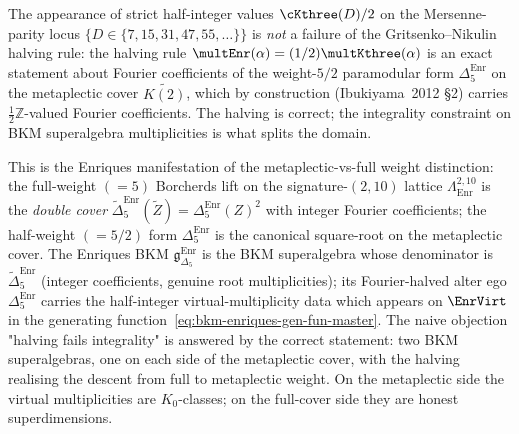 \begin{remark}
\label{rem:bkm-enriques-integrality-dichotomy}
The appearance of strict half-integer values $\cKthree(D)/2$ on the
Mersenne-parity locus $\{D\in\{7,15,31,47,55,\ldots\}\}$ is \emph{not}
a failure of the Gritsenko--Nikulin halving rule: the halving rule
$\multEnr(\alpha) = (1/2)\multKthree(\alpha)$ is an exact statement
about Fourier coefficients of the weight-$5/2$ paramodular form
$\Delta_5^{\mathrm{Enr}}$ on the metaplectic cover
$\widetilde{K(2)}$, which by construction (Ibukiyama~2012 \S 2)
carries $\tfrac{1}{2}\mathbb{Z}$-valued Fourier coefficients.
The halving is correct; the integrality constraint on BKM
superalgebra multiplicities is what splits the domain.

This is the Enriques manifestation of the metaplectic-vs-full
weight distinction: the full-weight $(= 5)$ Borcherds lift on the
signature-$(2,10)$ lattice $\Lambda^{2,10}_{\mathrm{Enr}}$ is the
\emph{double cover} $\tilde\Delta_5^{\mathrm{Enr}}(\tilde Z) =
\Delta_5^{\mathrm{Enr}}(Z)^2$ with integer Fourier coefficients;
the half-weight $(= 5/2)$ form $\Delta_5^{\mathrm{Enr}}$ is the
canonical square-root on the metaplectic cover. The Enriques BKM
$\mathfrak{g}_{\Delta_5}^{\mathrm{Enr}}$ is the BKM superalgebra
whose denominator is $\tilde\Delta_5^{\mathrm{Enr}}$ (integer
coefficients, genuine root multiplicities); its Fourier-halved
alter ego $\Delta_5^{\mathrm{Enr}}$ carries the half-integer
virtual-multiplicity data which appears on $\EnrVirt$ in the
generating function~\eqref{eq:bkm-enriques-gen-fun-master}. The
naive objection "halving fails integrality" is answered by the correct
statement: two BKM superalgebras, one on each side of the
metaplectic cover, with the halving realising the descent from
full to metaplectic weight. On the metaplectic side the virtual
multiplicities are $K_0$-classes; on the full-cover side they are
honest superdimensions.
\end{remark}

